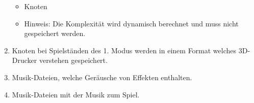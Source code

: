 \begin{enumerate}
  \begin{itemize}
     \item Knoten
     \item Hinweis: Die Komplexität wird dynamisch berechnet und muss nicht gespeichert werden.
  \end{itemize}
  
\item Knoten bei Spielständen des 1. Modus werden in einem Format welches 3D-Drucker verstehen gespeichert.
\item Musik-Dateien, welche Geräusche von Effekten enthalten.
\item Musik-Dateien mit der Musik zum Spiel.



\end{enumerate}


